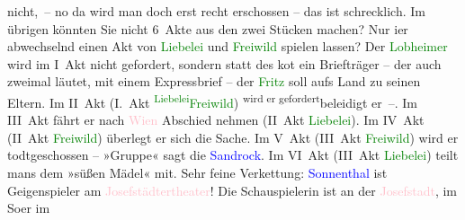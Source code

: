                nicht, – no da wird man doch erst recht erschossen – das ist schrecklich. Im übrigen
               könnten Sie nicht 6 Akte aus den zwei Stücken {\pb}machen? Nur i{\geminationm}er abwechselnd einen Akt von \textcolor{green}{Liebelei}{}\ledrightnote{\textcolor{green}{Liebelei. Schauspiel in drei Akten}} und \textcolor{green}{Freiwild}{}\ledrightnote{\textcolor{green}{Freiwild. Schauspiel in 3 Akten}} spielen
               lassen?\pend
           \pstart
           Der \textcolor{green}{Lobheimer}{} wird im I Akt nicht
               gefordert, sondern statt des \label{K_L00594_1v}\label{K_L00594_1h} ko{\geminationm}t ein Briefträger – der auch zweimal läutet, {\pb}mit einem Expressbrief – der \strikeout{\textcolor{blue}{Pau}{}\ledrightnote{\textcolor{blue}{Paul Goldmann}}}{ }\textcolor{green}{Fritz}{} soll aufs Land zu seinen
               Eltern. Im II Akt (I. Akt \substVorne{}\textsuperscript{\textcolor{green}{Liebelei}{}\ledrightnote{\textcolor{green}{Liebelei. Schauspiel in drei Akten}}}{\allowbreak}\substDazwischen{}\textcolor{green}{Freiwild}{}\ledrightnote{\textcolor{green}{Freiwild. Schauspiel in 3 Akten}}\substHinten{}) \substVorne{}\textsuperscript{wird er gefordert}{\allowbreak}\substDazwischen{}beleidigt er –\substHinten{}.\pend
           \pstart
           Im III Akt fährt er nach \textcolor{pink}{Wien}{}\ledrightnote{\textcolor{pink}{Wien}} Abschied nehmen (II Akt
                  \textcolor{green}{Liebelei}{}\ledrightnote{\textcolor{green}{Liebelei. Schauspiel in drei Akten}}).\pend
           \pstart
           Im IV Akt (II Akt {\pb}\textcolor{green}{Freiwild}{}\ledrightnote{\textcolor{green}{Freiwild. Schauspiel in 3 Akten}}) überlegt er sich die Sache. Im V Akt
               (III Akt \textcolor{green}{Freiwild}{}\ledrightnote{\textcolor{green}{Freiwild. Schauspiel in 3 Akten}}) wird er todtgeschossen –
               »Gruppe« sagt die \textcolor{blue}{Sandrock}{}\ledrightnote{\textcolor{blue}{Adele Sandrock}}. Im VI Akt (III Akt
                  \textcolor{green}{Liebelei}{}\ledrightnote{\textcolor{green}{Liebelei. Schauspiel in drei Akten}}) teilt mans {\pb}dem »süßen Mädel« mit. Sehr feine
               Verkettung: \textcolor{blue}{Sonnenthal}{}\ledrightnote{\textcolor{blue}{Adolf von Sonnenthal}} ist Geigenspieler am \textcolor{pink}{Josefstädtertheater}{}\ledrightnote{\textcolor{pink}{Theater in der Josefstadt}}! Die Schauspielerin ist an der \textcolor{pink}{Josefstadt}{}\ledrightnote{\textcolor{pink}{VIII., Josefstadt}}, im So{\geminationm}er im
